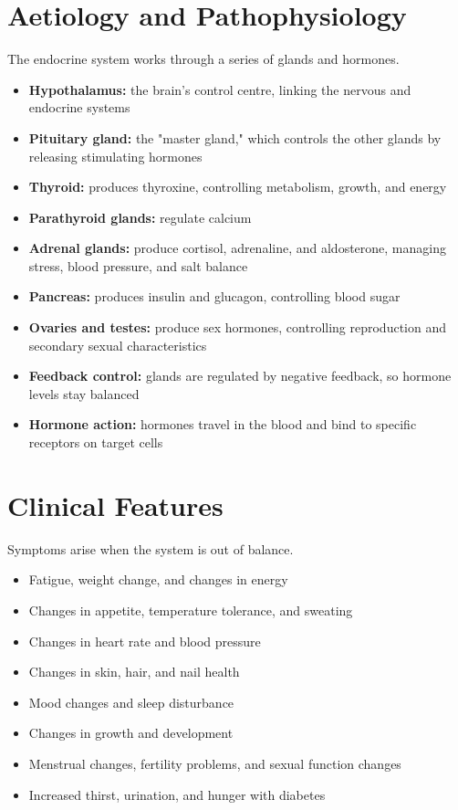 \section*{Aetiology and Pathophysiology}
The endocrine system works through a series of glands and hormones.
\begin{itemize}
    \item \textbf{Hypothalamus:} the brain's control centre, linking the nervous and endocrine systems
    \item \textbf{Pituitary gland:} the "master gland," which controls the other glands by releasing stimulating hormones
    \item \textbf{Thyroid:} produces thyroxine, controlling metabolism, growth, and energy
    \item \textbf{Parathyroid glands:} regulate calcium
    \item \textbf{Adrenal glands:} produce cortisol, adrenaline, and aldosterone, managing stress, blood pressure, and salt balance
    \item \textbf{Pancreas:} produces insulin and glucagon, controlling blood sugar
    \item \textbf{Ovaries and testes:} produce sex hormones, controlling reproduction and secondary sexual characteristics
    \item \textbf{Feedback control:} glands are regulated by negative feedback, so hormone levels stay balanced
    \item \textbf{Hormone action:} hormones travel in the blood and bind to specific receptors on target cells
\end{itemize}

\section*{Clinical Features}
Symptoms arise when the system is out of balance.
\begin{itemize}
    \item Fatigue, weight change, and changes in energy
    \item Changes in appetite, temperature tolerance, and sweating
    \item Changes in heart rate and blood pressure
    \item Changes in skin, hair, and nail health
    \item Mood changes and sleep disturbance
    \item Changes in growth and development
    \item Menstrual changes, fertility problems, and sexual function changes
    \item Increased thirst, urination, and hunger with diabetes
\end{itemize}

